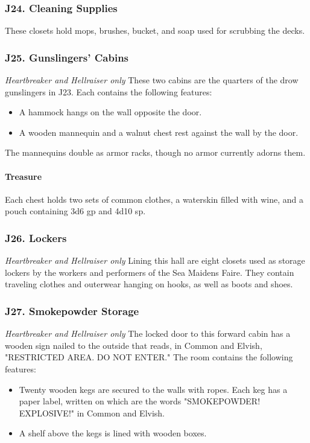 \documentclass[10pt,a4paper,twoside,twocolumn,openany,nodeprecatedcode]{dndbook}
\begin{document}
\subsubsection{J24. Cleaning Supplies}
These closets hold mops, brushes, bucket, and soap used for scrubbing the decks.
\subsubsection{J25. Gunslingers' Cabins}
\textit{Heartbreaker and Hellraiser only}
These two cabins are the quarters of the drow gunslingers in J23. Each contains the following features:
\begin{itemize}

\item A hammock hangs on the wall opposite the door.
\item A wooden mannequin and a walnut chest rest against the wall by the door.
\end{itemize}


The mannequins double as armor racks, though no armor currently adorns them.
\paragraph{Treasure}
Each chest holds two sets of common clothes, a waterskin filled with wine, and a pouch containing 3d6 gp and 4d10 sp.
\subsubsection{J26. Lockers}
\textit{Heartbreaker and Hellraiser only}
Lining this hall are eight closets used as storage lockers by the workers and performers of the Sea Maidens Faire. They contain traveling clothes and outerwear hanging on hooks, as well as boots and shoes.
\subsubsection{J27. Smokepowder Storage}
\textit{Heartbreaker and Hellraiser only}
The locked door to this forward cabin has a wooden sign nailed to the outside that reads, in Common and Elvish, "RESTRICTED AREA. DO NOT ENTER." The room contains the following features:
\begin{itemize}

\item Twenty wooden kegs are secured to the walls with ropes. Each keg has a paper label, written on which are the words "SMOKEPOWDER! EXPLOSIVE!" in Common and Elvish.
\item A shelf above the kegs is lined with wooden boxes.
\end{itemize}
\end{document}
